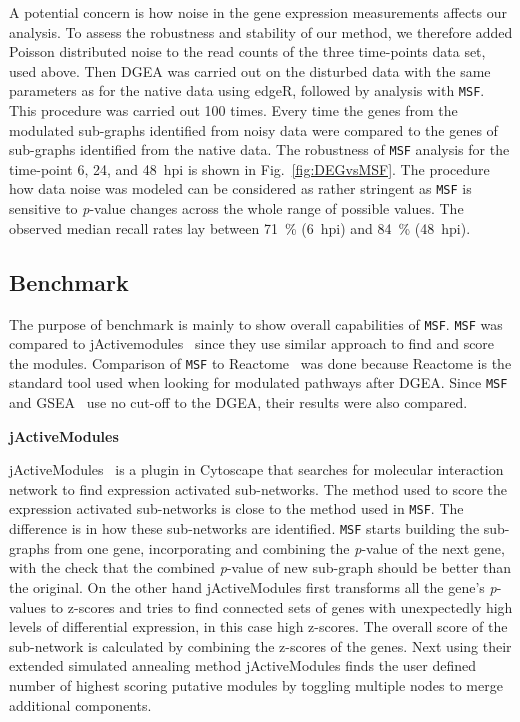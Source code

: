 \documentclass[10pt,a4paper,twocolumn]{article}
\newcommand{\DONE}[1]{\begingroup\color{blue}#1\endgroup}
\begin{document}
	A potential concern is how noise in the gene expression
        measurements affects our analysis. To assess the robustness
        and stability of our method, we therefore added Poisson
        distributed noise to the read counts of the three time-points
        data set, used above.  Then DGEA was carried out on the
        disturbed data with the same parameters as for the native data
        using edgeR, followed by analysis with \texttt{MSF}. This
        procedure was carried out 100 times.  Every time the genes
        from the modulated sub-graphs identified from noisy data were
        compared to the genes of sub-graphs identified from the native
        data. The robustness of \texttt{MSF} analysis for the
        time-point 6, 24, and 48~hpi is shown in
        Fig.~\ref{fig:DEGvsMSF}. The procedure how data noise was
        modeled can be considered as rather stringent as \texttt{MSF}
        is sensitive to \textit{p}-value changes across the whole
        range of possible values. The observed median recall rates lay
        between 71~\% (6~hpi) and 84~\% (48~hpi).
	
	\subsection*{Benchmark}
	
	 \DONE{The purpose of benchmark is mainly to show overall capabilities of \texttt{MSF}. \texttt{MSF} was compared to jActivemodules~\cite{jActiveModules} since they use similar approach to find and score the modules. Comparison of \texttt{MSF} to Reactome~\cite{Reactome} was done because  Reactome is the standard tool used when looking for modulated pathways after DGEA. Since \texttt{MSF} and GSEA~\cite{Subramanian15545} use no cut-off to the DGEA, their results were also compared.}
	
	\textbf{jActiveModules}
	
	jActiveModules~\cite{jActiveModules} is a plugin in Cytoscape that searches for molecular
        interaction network to find expression activated
        sub-networks. The method used to score the expression
        activated sub-networks is close to the method used in
        \texttt{MSF}.  \DONE{The difference is in how these sub-networks are identified. \texttt{MSF} starts building the sub-graphs from one gene, incorporating and combining the \textit{p}-value of the next gene, with the check that the combined \textit{p}-value of new sub-graph should be better than the original. On the other hand jActiveModules first transforms all the gene’s \textit{p}-values to z-scores and tries to find connected sets of genes with unexpectedly high levels of differential expression, in this case high z-scores. The overall score of the sub-network is calculated by combining the z-scores of the genes. Next using their extended simulated annealing method jActiveModules finds the user defined number of highest scoring putative modules by toggling multiple nodes to merge additional components.} 
	
\end{document}
